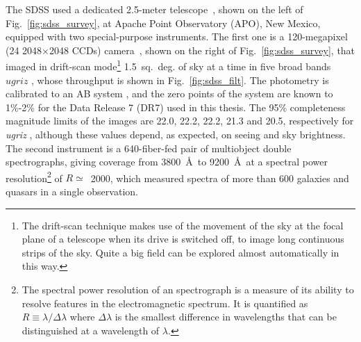 The SDSS used a dedicated 2.5-meter telescope~\citep{Gunn2006}, shown on the left of Fig.~\ref{fig:sdss_survey}, at Apache Point Observatory (APO), New Mexico, equipped with two special-purpose instruments. The first one is a 120-megapixel (24 2048$\times$2048 CCDs) camera~\citep{Gunn1998}, shown on the right of Fig.~\ref{fig:sdss_survey}, that imaged in drift-scan mode\footnote{The drift-scan technique makes use of the movement of the sky at the focal plane of a telescope when its drive is switched off, to image long continuous strips of the sky. Quite a big field can be explored almost automatically in this way.} 1.5~sq.~deg. of sky at a time in five broad bands $ugriz$ \citep{Fukugita1996}, whose throughput is shown in Fig.~\ref{fig:sdss_filt}. The photometry is calibrated to an AB system \citep{Oke1983}, and the zero points of the system are known to 1\%-2\% \citep{Abazajian2004} for the Data Release 7 (DR7) used in this thesis. The 95\% completeness magnitude limits of the images are 22.0, 22.2, 22.2, 21.3 and 20.5, respectively for \textit{ugriz} \citep{Abazajian2004}, although these values depend, as expected, on seeing and sky brightness. The second instrument is a 640-fiber-fed pair of multiobject double spectrographs, giving coverage from 3800~\AA \ to 9200~\AA \ at a spectral power resolution\footnote{The spectral power resolution of an spectrograph is a measure of its ability to resolve features in the electromagnetic spectrum. It is quantified as $R \equiv \lambda / \Delta \lambda$ where $\Delta \lambda$ is the smallest difference in wavelengths that can be distinguished at a wavelength of $\lambda$.} of $R\simeq$~2000, which measured spectra of more than 600 galaxies and quasars in a single observation. 

